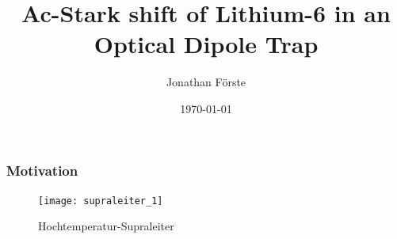 \documentclass{beamer}
\title{Ac-Stark shift of Lithium-6 in an Optical Dipole Trap}
\author{Jonathan Förste}
\date{\today}
\begin{document}
\maketitle
\begin{frame}
	\frametitle{Motivation}
	\begin{figure}
	\centering
	\texttt{[image: supraleiter\_1]}
	\caption{Hochtemperatur-Supraleiter}
	\end{figure}
\end{frame}

%	
\end{document}
